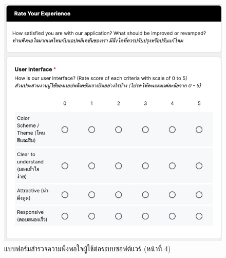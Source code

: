 \documentclass[12pt,one side,openright,a4paper]{cpe-thesis-th}
\begin{document}
\begin{figure}[H]
  \centering
  \includegraphics[width=15cm]{figure/results/forms/survey-google-p3-1.png}
  \caption[แบบฟอร์มสำรวจความพึงพอใจผู้ใช้ต่อระบบซอฟต์แวร์ (หน้าที่ 4)]{แบบฟอร์มสำรวจความพึงพอใจผู้ใช้ต่อระบบซอฟต์แวร์ (หน้าที่ 4)}
\end{figure}
\end{document}
